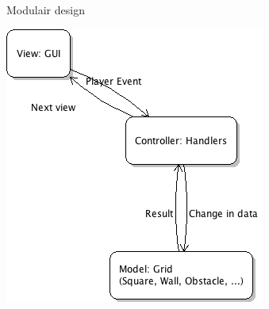 \documentclass[t]{beamer}
\begin{document}
\begin{frame}[plain]{Modulair design}
\begin{center}
\includegraphics[width= 0.5\linewidth]{../uml/MVC.png}
\end{center}
\end{frame}
\end{document}
